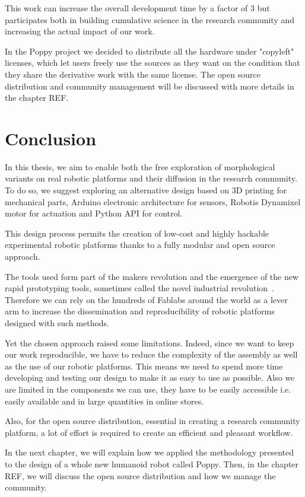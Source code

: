 This work can increase the overall development time by a factor of 3 but participates both in building cumulative science in the research community and increasing the actual impact of our work.

In the Poppy project we decided to distribute all the hardware under "copyleft" licenses, which let users freely use the sources as they want on the condition that they share the derivative work with the same license.
The open source distribution and community management will be discussed with more details in the chapter REF.


\section{Conclusion} %

In this thesis, we aim to enable both the free exploration of morphological variants on real robotic platforms and their diffusion in the research community. To do so, we suggest exploring an alternative design based on 3D printing for mechanical parts, Arduino electronic architecture for sensors, Robotis Dynamixel motor for actuation and Python API for control.

This design process permits the creation of low-cost and highly hackable experimental robotic platforms thanks to a fully modular and open source approach.

The tools used form part of the makers revolution and the emergence of the new rapid prototyping tools, sometimes called the novel industrial revolution~\parencite{anderson2012makers}. Therefore we can rely on the hundreds of Fablabs around the world as a lever arm to increase the dissemination and reproducibility of robotic platforms designed with such methods.

Yet the chosen approach raised some limitations. Indeed, since we want to keep our work reproducible, we have to reduce the complexity of the assembly as well as the use of our robotic platforms. This means we need to spend more time developing and testing our design to make it as easy to use as possible. Also we are limited in the components we can use, they have to be easily accessible i.e. easily available and in large quantities in online stores.

Also, for the open source distribution, essential in creating a research community platform, a lot of effort is required to create an efficient and pleasant workflow.

In the next chapter, we will explain how we applied the methodology presented to the design of a whole new humanoid robot called Poppy. Then, in the chapter REF, we will discuss the open source distribution and how we manage the community.





